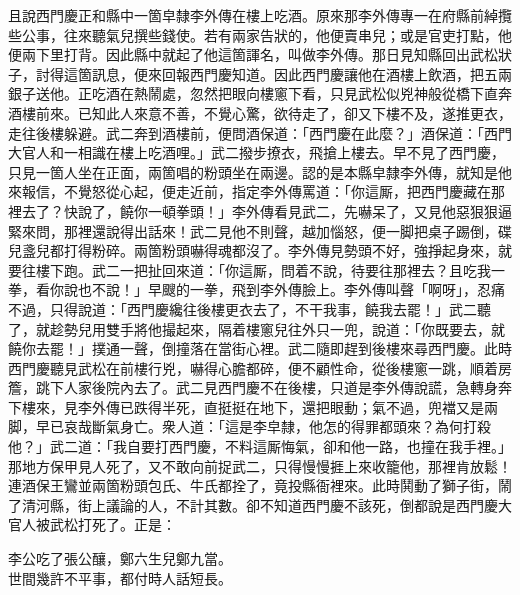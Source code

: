 且說西門慶正和縣中一箇皁隸李外傳在樓上吃酒。原來那李外傳專一在府縣前綽攬些公事，往來聽氣兒撰些錢使。若有兩家告狀的，他便賣串兒；或是官吏打點，他便兩下里打背。因此縣中就起了他這箇諢名，叫做李外傳。那日見知縣回出武松狀子，討得這箇訊息，便來回報西門慶知道。因此西門慶讓他在酒樓上飲酒，把五兩銀子送他。正吃酒在熱鬧處，忽然把眼向樓窻下看，只見武松似兇神般從橋下直奔酒樓前來。已知此人來意不善，不覺心驚，欲待走了，卻又下樓不及，遂推更衣，走往後樓躲避。武二奔到酒樓前，便問酒保道：「西門慶在此麼？」酒保道：「西門大官人和一相識在樓上吃酒哩。」武二撥步撩衣，飛搶上樓去。早不見了西門慶，只見一箇人坐在正面，兩箇唱的粉頭坐在兩邊。{}認的是本縣皁隸李外傳，就知是他來報信，不覺怒從心起，便走近前，指定李外傳罵道：「你這厮，把西門慶藏在那裡去了？快說了，饒你一頓拳頭！」李外傳看見武二，先嚇呆了，又見他惡狠狠逼緊來問，那裡還說得出話來！武二見他不則聲，越加惱怒，便一脚把桌子踢倒，碟兒盞兒都打得粉碎。兩箇粉頭嚇得魂都沒了。李外傳見勢頭不好，強掙起身來，就要往樓下跑。武二一把扯回來道：「你這厮，問着不說，待要往那裡去？且吃我一拳，看你說也不說！」早颼的一拳，飛到李外傳臉上。李外傳叫聲「啊呀」，忍痛不過，只得說道：「西門慶纔往後樓更衣去了，不干我事，饒我去罷！」武二聽了，就趁勢兒用雙手將他撮起來，隔着樓窻兒往外只一兜，說道：「你既要去，就饒你去罷！」撲通一聲，倒撞落在當街心裡。武二隨即趕到後樓來尋西門慶。此時西門慶聽見武松在前樓行兇，嚇得心膽都碎，便不顧性命，從後樓窻一跳，順着房簷，跳下人家後院內去了。武二見西門慶不在後樓，只道是李外傳說謊，急轉身奔下樓來，見李外傳已跌得半死，直挺挺在地下，還把眼動；氣不過，兜襠又是兩脚，早已哀哉斷氣身亡。衆人道：「這是李皁隸，他怎的得罪都頭來？為何打殺他？」武二道：「我自要打西門慶，不料這厮悔氣，卻和他一路，也撞在我手裡。」那地方保甲見人死了，又不敢向前捉武二，只得慢慢捱上來收籠他，那裡肯放鬆！連酒保王鸞並兩箇粉頭包氏、牛氏都拴了，竟投縣衙裡來。此時鬨動了獅子街，鬧了清河縣，街上議論的人，不計其數。卻不知道西門慶不該死，倒都說是西門慶大官人被武松打死了。{}正是：

\begin{myquote}
李公吃了張公釀，鄭六生兒鄭九當。\\世間幾許不平事，都付時人話短長。
\end{myquote}

 

